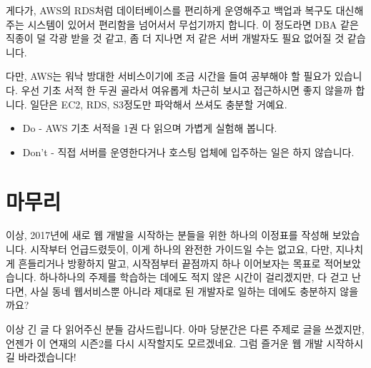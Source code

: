 \documentclass[11pt,a4paper]{article}
\begin{document}
게다가, AWS의 RDS처럼 데이터베이스를 편리하게 운영해주고 백업과 복구도 대신해주는 시스템이 있어서 편리함을 넘어서서 무섭기까지 합니다. 이 정도라면 DBA 같은 직종이 덜 각광 받을 것 같고, 좀 더 지나면 저 같은 서버 개발자도 필요 없어질 것 같습니다.

다만, AWS는 워낙 방대한 서비스이기에 조금 시간을 들여 공부해야 할 필요가 있습니다. 우선 기초 서적 한 두권 골라서 여유롭게 차근히 보시고 접근하시면 좋지 않을까 합니다. 일단은 EC2, RDS, S3정도만 파악해서 쓰셔도 충분할 거예요.

\begin{itemize}
\item{Do} - AWS 기초 서적을 1권 다 읽으며 가볍게 실험해 봅니다.
\item{Don't} - 직접 서버를 운영한다거나 호스팅 업체에 입주하는 일은 하지 않습니다.
\end{itemize}

\section{마무리}

이상, 2017년에 새로 웹 개발을 시작하는 분들을 위한 하나의 이정표를 작성해 보았습니다. 시작부터 언급드렸듯이, 이게 하나의 완전한 가이드일 수는 없고요, 다만, 지나치게 흔들리거나 방황하지 말고, 시작점부터 끝점까지 하나 이어보자는 목표로 적어보았습니다. 하나하나의 주제를 학습하는 데에도 적지 않은 시간이 걸리겠지만, 다 걷고 난다면, 사실 동네 웹서비스뿐 아니라 제대로 된 개발자로 일하는 데에도 충분하지 않을까요?

이상 긴 글 다 읽어주신 분들 감사드립니다. 아마 당분간은 다른 주제로 글을 쓰겠지만, 언젠가 이 연재의 시즌2를 다시 시작할지도 모르겠네요. 그럼 즐거운 웹 개발 시작하시길 바라겠습니다!
\end{document}
